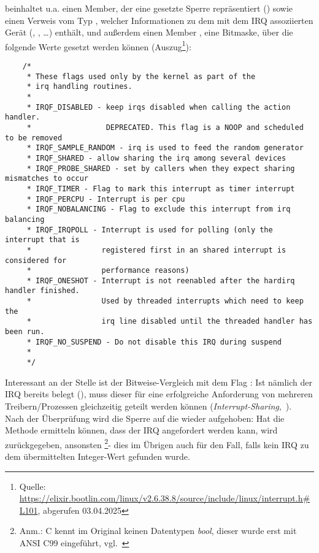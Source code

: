 \noindent
{} beinhaltet u.a. einen Member, der eine gesetzte Sperre repräsentiert () sowie einen Verweis  vom Typ , welcher Informationen zu dem mit dem IRQ assoziierten Gerät (, , \ldots) enthält, und außerdem einen Member , eine Bitmaske, über die folgende Werte gesetzt werden können (Auszug\footnote{
Quelle: \url{https://elixir.bootlin.com/linux/v2.6.38.8/source/include/linux/interrupt.h#L101}, abgerufen 03.04.2025
}):

\begin{verbatim}
    /*
     * These flags used only by the kernel as part of the
     * irq handling routines.
     *
     * IRQF_DISABLED - keep irqs disabled when calling the action handler.
     *                 DEPRECATED. This flag is a NOOP and scheduled to be removed
     * IRQF_SAMPLE_RANDOM - irq is used to feed the random generator
     * IRQF_SHARED - allow sharing the irq among several devices
     * IRQF_PROBE_SHARED - set by callers when they expect sharing mismatches to occur
     * IRQF_TIMER - Flag to mark this interrupt as timer interrupt
     * IRQF_PERCPU - Interrupt is per cpu
     * IRQF_NOBALANCING - Flag to exclude this interrupt from irq balancing
     * IRQF_IRQPOLL - Interrupt is used for polling (only the interrupt that is
     *                registered first in an shared interrupt is considered for
     *                performance reasons)
     * IRQF_ONESHOT - Interrupt is not reenabled after the hardirq handler finished.
     *                Used by threaded interrupts which need to keep the
     *                irq line disabled until the threaded handler has been run.
     * IRQF_NO_SUSPEND - Do not disable this IRQ during suspend
     *
     */
\end{verbatim}

\noindent
Interessant an der Stelle ist der Bitweise-Vergleich mit dem Flag : Ist nämlich der IRQ bereits belegt (), muss dieser für eine erfolgreiche Anforderung von mehreren Treibern/Prozessen gleichzeitig geteilt werden können (\textit{Interrupt-Sharing},~\cite[59]{Man20d}).\\

\noindent
Nach der Überprüfung wird die Sperre auf die  wieder aufgehoben: Hat die Methode ermitteln können, dass der IRQ angefordert werden kann, wird  zurückgegeben, ansonsten \footnote{
Anm.: C kennt im Original keinen Datentypen \textit{bool}, dieser wurde erst mit ANSI C99 eingeführt, vgl.~\cite[8]{ES3}
}- dies im Übrigen auch für den Fall, falls kein IRQ zu dem übermittelten Integer-Wert gefunden wurde.

